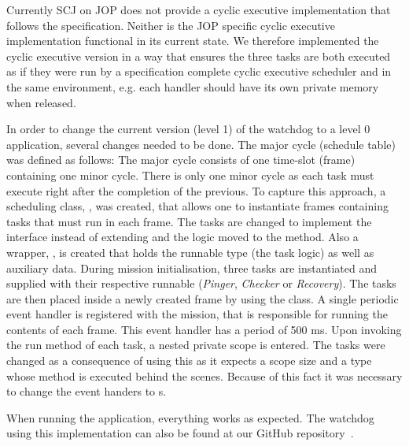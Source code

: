 Currently SCJ on JOP does not provide a cyclic executive implementation that follows the specification. Neither is the JOP specific cyclic executive implementation functional in its current state. We therefore implemented the cyclic executive version in a way that ensures the three tasks are both executed as if they were run by a specification complete cyclic executive scheduler and in the same environment, e.g. each handler should have its own private memory when released.

In order to change the current version (level 1) of the watchdog to a level 0 application, several changes needed to be done. The major cycle (schedule table) was defined as follows: The major cycle consists of one time-slot (frame) containing one minor cycle. There is only one minor cycle as each task must execute right after the completion of the previous. To capture this approach, a scheduling class, , was created, that allows one to instantiate frames containing tasks that must run in each frame. The tasks are changed to implement the  interface instead of extending  and the logic moved to the  method. Also a wrapper, , is created that holds the runnable type (the task logic) as well as auxiliary data. During mission initialisation, three tasks are instantiated and supplied with their respective runnable (\textit{Pinger}, \textit{Checker} or \textit{Recovery}). The tasks are then placed inside a newly created frame by using the  class. A single periodic event handler is registered with the mission, that is responsible for running the contents of each frame. This event handler has a period of 500 ms. Upon invoking the run method of each task, a nested private scope is entered. The tasks were changed as a consequence of using this  as it expects a scope size and a  type whose  method is executed behind the scenes. Because of this fact it was necessary to change the event handers to s.

When running the application, everything works as expected. The watchdog using this implementation can also be found at our GitHub repository~\cite{SW902e12:CSPinSCJ}.


